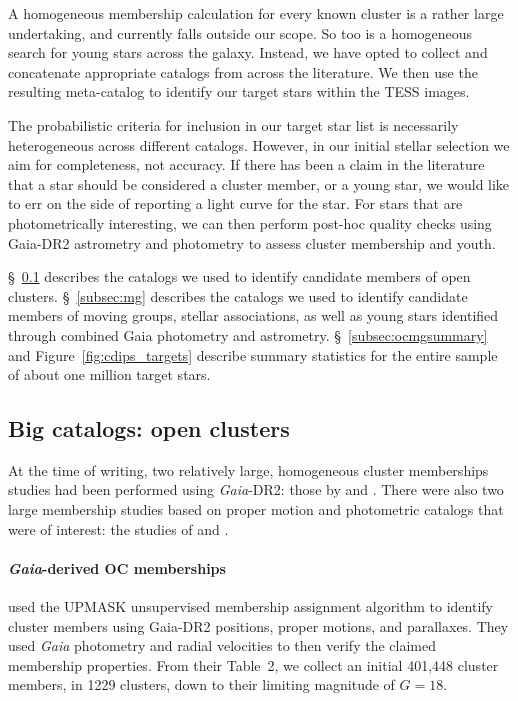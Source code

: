 \documentclass[12pt,twocolumn,tighten]{aastex62}
\begin{document}
A homogeneous membership calculation for every known cluster is a
rather large undertaking, and currently falls outside our scope.  So
too is a homogeneous search for young stars across the galaxy.
Instead, we have opted to collect and concatenate appropriate catalogs
from across the literature.  We then use the resulting meta-catalog to
identify our target stars within the TESS images.

The probabilistic criteria for inclusion in our target star list is
necessarily heterogeneous across different catalogs.  However, in our
initial stellar selection we aim for completeness, not accuracy.  If
there has been a claim in the literature that a star should be
considered a cluster member, or a young star, we would like to err on
the side of reporting a light curve for the star.  For stars that are
photometrically interesting, we can then perform post-hoc quality
checks using Gaia-DR2 astrometry and photometry to assess cluster
membership and youth.

\S~\ref{subsec:oc} describes the catalogs we used to identify
candidate members of open clusters.  \S~\ref{subsec:mg} describes the
catalogs we used to identify candidate members of moving groups,
stellar associations, as well as young stars identified through
combined Gaia photometry and astrometry.  \S~\ref{subsec:ocmgsummary}
and Figure~\ref{fig:cdips_targets} describe summary statistics for the
entire sample of about one million target stars.

\subsection{Big catalogs: open clusters}
\label{subsec:oc}

At the time of writing, two relatively large, homogeneous cluster
memberships studies had been performed using {\it Gaia}-DR2: those by
\citet{cantat-gaudin_gaia_2018} and \citet{gaia_hr_2018}.
There were also two large membership studies based on proper motion and 
photometric catalogs that were of interest: the studies of
\citet{Kharchenko_et_al_2013} and \citet{dias_proper_2014}.

\paragraph{{\it Gaia}-derived OC memberships}

\citet{cantat-gaudin_gaia_2018} used the UPMASK unsupervised membership
assignment algorithm \citep{krone-martins_upmask_2014} to identify cluster
members using Gaia-DR2 positions, proper motions, and parallaxes.
They used {\it Gaia} photometry and radial velocities to then verify the
claimed membership properties.  From their Table~2, we collect an initial
401{,}448 cluster members, in 1229 clusters, down to their limiting magnitude
of $G=18$.
\end{document}

